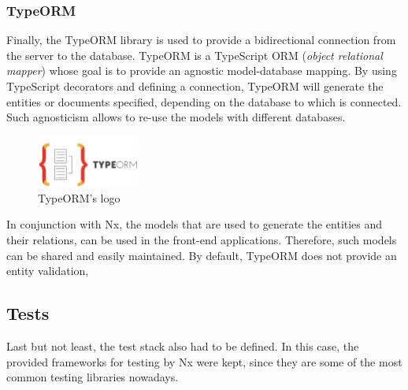 \documentclass[a4paper, 12pt, oneside]{book}
\begin{document}
\subsubsection{TypeORM}
Finally, the TypeORM library is used to provide a bidirectional connection from the server to the database. TypeORM is a TypeScript ORM (\emph{object relational mapper}) whose goal is to provide an agnostic model-database mapping. By using TypeScript decorators and defining a connection, TypeORM will generate the entities or documents specified, depending on the database to which is connected. Such agnosticism allows to re-use the models with different databases.
\begin{figure}[H]
	\centering
	\includegraphics[width=0.3\textwidth]{assets/typeorm-logo.png}
	\caption{TypeORM's logo}
\end{figure}
In conjunction with Nx, the models that are used to generate the entities and their relations, can be used in the front-end applications. Therefore, such models can be shared and easily maintained. By default, TypeORM does not provide an entity validation,
\subsection{Tests}
Last but not least, the test stack also had to be defined. In this case, the provided frameworks for testing by Nx were kept, since they are some of the most common testing libraries nowadays.
\end{document}
